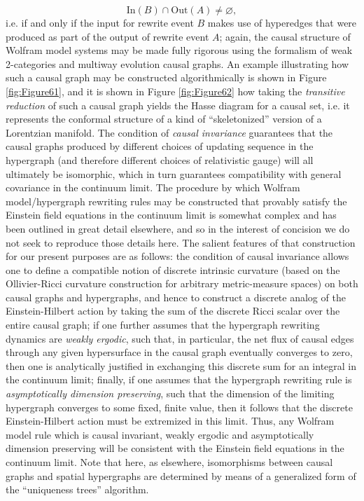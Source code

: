 \documentclass{article}
\begin{document}
\begin{equation}
\mathrm{In} \left( B \right) \cap \mathrm{Out} \left( A \right) \neq \varnothing,
\end{equation}
i.e. if and only if the input for rewrite event $B$ makes use of hyperedges that were produced as part of the output of rewrite event $A$; again, the causal structure of Wolfram model systems may be made fully rigorous using the formalism of weak 2-categories and multiway evolution causal graphs\cite{gorard9}. An example illustrating how such a causal graph may be constructed algorithmically is shown in Figure \ref{fig:Figure61}, and it is shown in Figure \ref{fig:Figure62} how taking the \textit{transitive reduction} of such a causal graph yields the Hasse diagram for a causal set, i.e. it represents the conformal structure of a kind of ``skeletonized'' version of a Lorentzian manifold\cite{gorard3}. The condition of \textit{causal invariance} guarantees that the causal graphs produced by different choices of updating sequence in the hypergraph (and therefore different choices of relativistic gauge) will all ultimately be isomorphic, which in turn guarantees compatibility with general covariance in the continuum limit. The procedure by which Wolfram model/hypergraph rewriting rules may be constructed that provably satisfy the Einstein field equations in the continuum limit is somewhat complex and has been outlined in great detail elsewhere\cite{gorard}\cite{gorard3}\cite{gorard4}, and so in the interest of concision we do not seek to reproduce those details here. The salient features of that construction for our present purposes are as follows: the condition of causal invariance allows one to define a compatible notion of discrete intrinsic curvature (based on the Ollivier-Ricci curvature construction for arbitrary metric-measure spaces\cite{ollivier}\cite{eidi}) on both causal graphs and hypergraphs, and hence to construct a discrete analog of the Einstein-Hilbert action by taking the sum of the discrete Ricci scalar over the entire causal graph; if one further assumes that the hypergraph rewriting dynamics are \textit{weakly ergodic}, such that, in particular, the net flux of causal edges through any given hypersurface in the causal graph eventually converges to zero, then one is analytically justified in exchanging this discrete sum for an integral in the continuum limit; finally, if one assumes that the hypergraph rewriting rule is \textit{asymptotically dimension preserving}, such that the dimension of the limiting hypergraph converges to some fixed, finite value, then it follows that the discrete Einstein-Hilbert action must be extremized in this limit. Thus, any Wolfram model rule which is causal invariant, weakly ergodic and asymptotically dimension preserving will be consistent with the Einstein field equations in the continuum limit. Note that here, as elsewhere, isomorphisms between causal graphs and spatial hypergraphs are determined by means of a generalized form of the ``uniqueness trees'' algorithm\cite{gorard10}.
\end{document}
